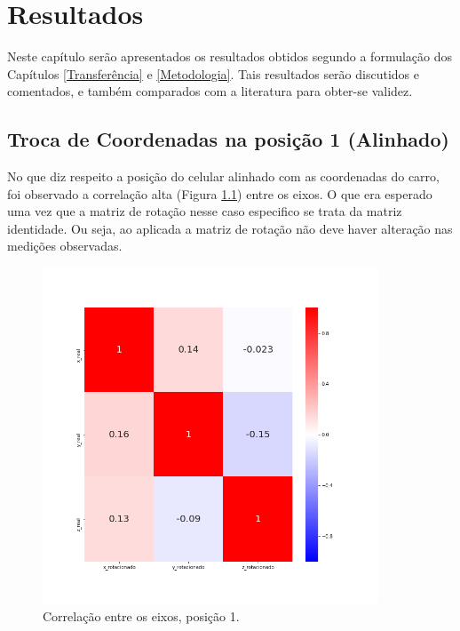 \chapter{Resultados}\label{Resultados}

Neste capítulo serão apresentados os resultados obtidos segundo a formulação dos Capítulos \ref{Transferência} e \ref{Metodologia}. Tais resultados serão discutidos e comentados, e também comparados com a literatura para obter-se validez.

\section{Troca de Coordenadas na posição 1 (Alinhado)}
No que diz respeito a posição do celular alinhado com as coordenadas do carro, foi observado a correlação alta (Figura \ref{fig:hmapTrip1}) entre os eixos. O que era esperado uma vez que a matriz de rotação nesse caso especifico se trata da matriz identidade. Ou seja, ao aplicada a matriz de rotação não deve haver alteração nas medições observadas.


\begin{figure}
    \centering
    \includegraphics[width=100mm]{Figuras/hmaptrip1.png}
    \caption{Correlação entre os eixos, posição 1.}
    \label{fig:hmapTrip1}
\end{figure}{}
 
